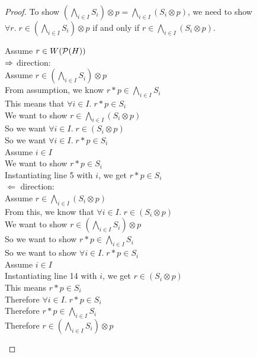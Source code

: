 \begin{proof}
To show $\left(\bigwedge_{i \in I} S_i\right) \otimes p = \bigwedge_{i \in I} (S_i \otimes p)$,
we need to show $\forall r.\; r \in \left(\bigwedge_{i \in I} S_i\right) \otimes p$ if
and only if $r \in \bigwedge_{i \in I} (S_i \otimes p)$. 

\begin{tabbedproof}
\oo Assume $r \in W(\mathcal{P}(H))$ \\[0.5em]

\ooo $\Rightarrow$ direction: \\
\oooo Assume $r \in \left(\bigwedge_{i \in I} S_i\right) \otimes p$ \\
\ooooo From assumption, we know $r * p \in \bigwedge_{i \in I} S_i$ \\
\ooooo This means that $\forall i \in I.\; r * p \in S_i$ \\
\ooooo We want to show $r \in \bigwedge_{i \in I} (S_i \otimes p)$ \\
\ooooo So we want $\forall i \in I.\; r \in (S_i \otimes p)$ \\
\ooooo So we want $\forall i \in I.\; r * p \in S_i$ \\
\ooooo Assume $i \in I$ \\
\oooooo We want to show $r * p \in S_i$ \\
\oooooo Instantiating line 5 with $i$, we get $r * p \in S_i$ \\[0.5em]

\ooo $\Leftarrow$ direction:  \\
\oooo Assume $r \in \bigwedge_{i \in I} (S_i \otimes p)$  \\
\ooooo From this, we know that $\forall i \in I.\; r \in (S_i \otimes p)$ \\
\ooooo We want to show $r \in \left(\bigwedge_{i \in I} S_i\right) \otimes p$ \\
\ooooo So we want to show $r * p \in \bigwedge_{i \in I} S_i$ \\
\ooooo So we want to show $\forall i \in I.\; r * p \in S_i$ \\
\ooooo Assume $i \in I$ \\
\oooooo Instantiating line 14 with $i$, we get $r \in (S_i \otimes p)$ \\
\oooooo This means $r * p \in S_i$ \\
\ooooo Therefore $\forall i \in I.\; r * p \in S_i$ \\
\ooooo Therefore $r * p \in \bigwedge_{i \in I} S_i$ \\
\ooooo Therefore $r \in \left(\bigwedge_{i \in I} S_i\right) \otimes p$ 
\end{tabbedproof}
\end{proof}

